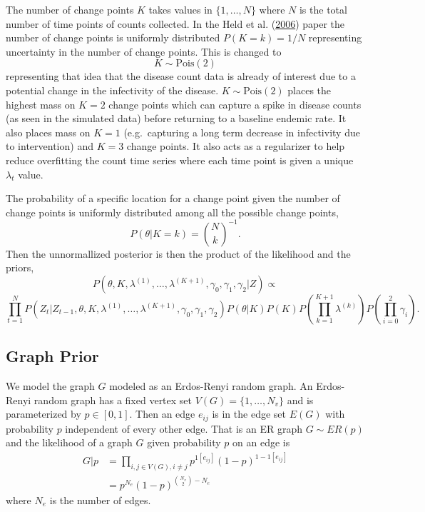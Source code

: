 \documentclass[11pt,a4paper]{article}
\numberwithin{equation}{section}
\begin{document}
The number of change points \(K\) takes values in \(\{1,\dots,N\}\)
where \(N\) is the total number of time points of counts collected. In
the Held et al. (\protect\hyperlink{ref-held_two-component_2006}{2006})
paper the number of change points is uniformly distributed
\(P(K = k) = 1/N\) representing uncertainty in the number of change
points. This is changed to \[K \sim \text{Pois}(2)\] representing that
idea that the disease count data is already of interest due to a
potential change in the infectivity of the disease.
\(K \sim\text{Pois}(2)\) places the highest mass on \(K = 2\) change
points which can capture a spike in disease counts (as seen in the
simulated data) before returning to a baseline endemic rate. It also
places mass on \(K = 1\) (e.g.~capturing a long term decrease in
infectivity due to intervention) and \(K = 3\) change points. It also
acts as a regularizer to help reduce overfitting the count time series
where each time point is given a unique \(\lambda_t\) value.

The probability of a specific location for a change point given the
number of change points is uniformly distributed among all the possible
change points, \[P(\theta|K=k) = \binom{N}{k}^{-1}.\] Then the
unnormallized posterior is then the product of the likelihood and the
priors,
\[ P(\theta, K, \lambda^{(1)}, \dots, \lambda^{(K+1)}, \gamma_0, \gamma_1, \gamma_2|Z)  \propto \]
\[\prod_{t=1}^N P(Z_t|Z_{t-1},\theta, K, \lambda^{(1)}, \dots, \lambda^{(K+1)}, \gamma_0, \gamma_1, \gamma_2)P(\theta|K)P(K)P(\prod_{k=1}^{K+1}\lambda^{(k)} )P(\prod_{i=0}^2 \gamma_i)  .\]

\hypertarget{graph-prior}{%
\subsection{Graph Prior}\label{graph-prior}}

We model the graph \(G\) modeled as an Erdos-Renyi random graph. An
Erdos-Renyi random graph has a fixed vertex set
\(V(G) = \{1, \dots, N_v\}\) and is parameterized by \(p \in [0,1]\).
Then an edge \(e_{ij}\) is in the edge set \(E(G)\) with probability
\(p\) independent of every other edge. That is an ER graph
\(G \sim ER(p)\) and the likelihood of a graph \(G\) given probability
\(p\) on an edge is
\[\begin{aligned} G|p & = \prod_{i,j \in V(G),i \neq j} p^{1[e_{ij}]}(1-p)^{1-1[e_{ij}]} 
\\ & = p^{N_e}(1-p)^{\binom{N_v}{2}-N_e} \end{aligned}\] where \(N_e\)
is the number of edges.
\end{document}
